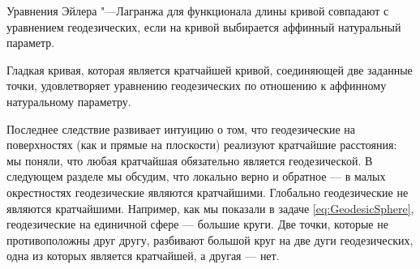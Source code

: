 \begin{theorem}
	Уравнения Эйлера "---Лагранжа для функционала длины кривой совпадают с уравнением геодезических, если на кривой выбирается аффинный натуральный параметр.
\end{theorem}

\begin{corollary}
	Гладкая кривая, которая является кратчайшей кривой, соединяющей две заданные точки, удовлетворяет уравнению геодезических по отношению к аффинному натуральному параметру.
\end{corollary}

Последнее следствие развивает интуицию о том, что геодезические на поверхностях (как и прямые на плоскости) реализуют кратчайшие расстояния: мы поняли, что любая кратчайшая обязательно является геодезической. В следующем разделе мы обсудим, что локально верно и обратное --- в малых окрестностях геодезические являются кратчайшими. Глобально геодезические не являются кратчайшими. Например, как мы показали в задаче \ref{eq:GeodesicSphere}, геодезические на единичной сфере --- большие круги. Две точки, которые не противоположны друг другу, разбивают большой круг на две дуги геодезических, одна из которых является кратчайшей, а другая --- нет.


